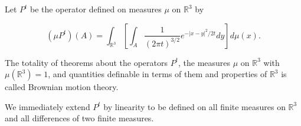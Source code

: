 Let $P^t$ be the operator defined on measures $\mu$ on $\mathbb{R}^3$ by

$$(\mu P^t)(A) = \int_{\mathbb{R}^3} \left[ \int_A \frac{1}{(2\pi t)^{3/2}} e^{-|x-y|^2/2t} dy \right] d\mu(x).$$

The totality of theorems about the operators $P^t$, the measures $\mu$ on $\mathbb{R}^3$ with $\mu(\mathbb{R}^3) = 1$, and quantities definable in terms of them and properties of $\mathbb{R}^3$ is called Brownian motion theory.

We immediately extend $P^t$ by linearity to be defined on all finite measures on $\mathbb{R}^3$ and all differences of two finite measures.
